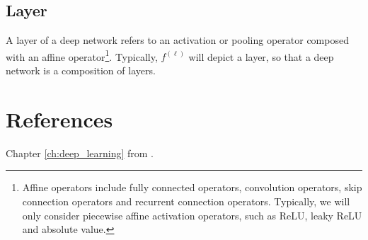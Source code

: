 \subsection{Layer}\label{subsec:layer}

A layer of a deep network refers to an activation or pooling operator composed with an affine operator\footnote{Affine operators include fully connected operators, convolution operators, skip connection operators and recurrent connection operators. Typically, we will only consider piecewise affine activation operators, such as ReLU, leaky ReLU and absolute value.}. Typically, $f^{(\ell)}$ will depict a layer, so that a deep network is a composition of layers.

\section{References}

Chapter \ref{ch:deep_learning} from \citet{balestrieroMadMaxAffine2018}.